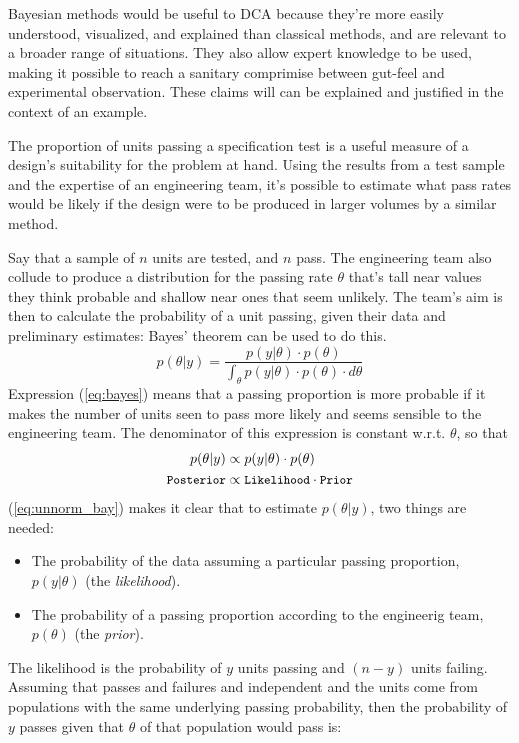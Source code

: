 \documentclass[11pt,a4paper,article]{memoir} %
\begin{document}
\par
Bayesian methods would be useful to DCA because they're more easily understood, visualized, and explained than classical methods, and are relevant to a broader range of situations. They also allow expert knowledge to be used, making it possible to reach a sanitary comprimise between gut-feel and experimental observation. These claims will can be explained and justified in the context of an example.
\par
The proportion of units passing a specification test is a useful measure of a design's suitability for the problem at hand. Using the results from a test sample and the expertise of an engineering team, it's possible to estimate what pass rates would be likely if the design were to be produced in larger volumes by a similar method.
\par
Say that a sample of $n$ units are tested, and $n$ pass. The engineering team also collude to produce a distribution for the passing rate $\theta$ that's tall near values they think probable and shallow near ones that seem unlikely. The team's aim is then to calculate the probability of a unit passing, given their data and preliminary estimates: Bayes' theorem can be used to do this.
\begin{equation}
  p(\theta|y) = \frac{p(y|\theta)\cdot p(\theta)}{\int_{\theta}p(y|\theta)\cdot p(\theta)\cdot d\theta}
  \label{eq:bayes}
\end{equation}
Expression (\ref{eq:bayes}) means that a passing proportion is more probable if it makes the number of units seen to pass more likely and seems sensible to the engineering team. The denominator of this expression is constant w.r.t. $\theta$, so that
\begin{align}
  p(\theta|y) &\propto p(y | \theta)\cdot p(\theta)   \label{eq:unnorm_bay} \\
  \small{\texttt{Posterior}} &\propto\small{{\texttt{Likelihood} \cdot \texttt{Prior}}} \nonumber
\end{align}
(\ref{eq:unnorm_bay}) makes it clear that to estimate $p(\theta|y)$, two things are needed:
\begin{itemize}
\item The probability of the data assuming a particular passing proportion, $p(y|\theta)$ (the \emph{likelihood}).
\item  The probability of a passing proportion according to the engineerig team, $p(\theta)$ (the \emph{prior}).
\end{itemize}
The likelihood is the probability of $y$ units passing and $(n-y)$ units failing. Assuming that passes and failures and independent and the units come from populations with the same underlying passing probability, then the probability of $y$ passes given that $\theta$ of that population would pass is:
\end{document}

